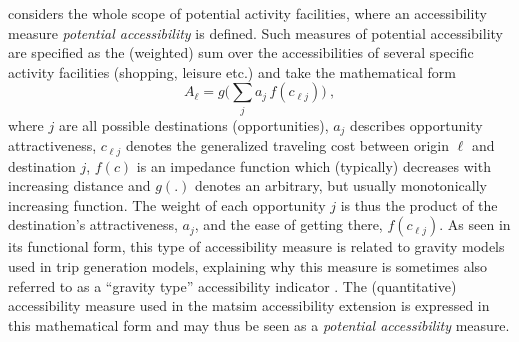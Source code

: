 \citet{Hansen1959HowAccessibilityShapesLandUse} 
considers the whole scope of potential activity facilities, where an accessibility 
measure \emph{potential accessibility} is defined. Such measures of potential accessibility are 
specified as the (weighted) sum over the 
accessibilities of several specific activity facilities (\eg shopping, leisure etc.) and take the mathematical form
\begin{equation}
	A_\ell = g\Big( \sum_j a_j \, f(c_{\ell j}) \Big) \ ,
	\label{eq:accessibility:basic}
\end{equation}
where $j$ are all possible destinations (opportunities), $a_j$ describes opportunity attractiveness, 
$c_{\ell j}$ denotes the generalized traveling cost between origin $\ell$ and destination $j$,
$f(c)$ is an impedance function which (typically) decreases with increasing distance and $g(.)$ denotes
an arbitrary, but usually monotonically increasing function. 
The weight of each opportunity $j$ is thus the product of the destination's attractiveness, $a_j$, and the ease of getting there, $f(c_{\ell j})$.
As seen in its 
functional form, this type of accessibility measure is related to gravity models used in trip generation models, explaining 
why this measure is sometimes also referred to as a ``gravity type'' accessibility indicator 
\citep{MorrisEtAl1979AccessibilityIndicators}. The (quantitative) accessibility measure used in the \gls{matsim} 
accessibility extension is expressed in this mathematical form and may thus be seen as a \emph{potential accessibility} measure.


